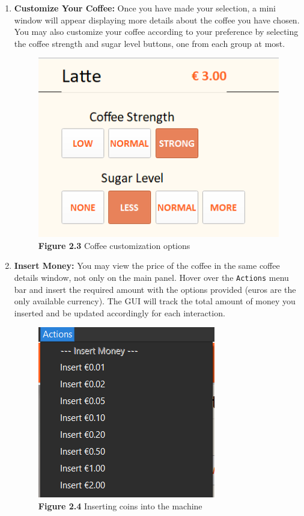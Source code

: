 \documentclass[a4paper, 11pt]{article}
\begin{document}
\begin{enumerate}
\item \textbf{Customize Your Coffee:}
Once you have made your selection, a mini window will appear displaying more details about the coffee you have chosen. You may also customize your coffee according to your preference by selecting the coffee strength and sugar level buttons, one from each group at most.
\vspace{3mm} 
\begin{figure}[H]
\centering
\includegraphics{Images/Figure2.3.PNG}
\caption*{\textbf{Figure 2.3} Coffee customization options} 
\end{figure}
\vspace{5mm} 

\item \textbf{Insert Money:}
You may view the price of the coffee in the same coffee details window, not only on the main panel. Hover over the \texttt{Actions} menu bar and insert the required amount with the options provided (euros are the only available currency). The GUI will track the total amount of money you inserted and be updated accordingly for each interaction.
\vspace{3mm} 
\begin{figure}[H]
\centering
\includegraphics{Images/Figure2.4.PNG}
\caption*{\textbf{Figure 2.4} Inserting coins into the machine} 
\end{figure}
\vspace{5mm} 


\end{enumerate}
\end{document}

